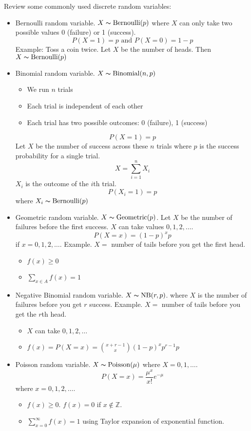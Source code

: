 Review some commonly used discrete random variables:
\begin{itemize}
    \item Bernoulli random variable. $ X \thicksim \text{Bernoulli}(p) $
          where $ X $ can only take two possible values 0 (failure) or 1 (success).
          \[ P(X=1)=p\text{ and }P(X=0)=1-p \]
          Example: Toss a coin twice. Let $ X $ be the number of heads.
          Then $ X \thicksim \text{Bernoulli}(p) $
    \item Binomial random variable. $ X \thicksim \operatorname{Binomial}(n,p) $
          \begin{itemize}
              \item We run $ n $ trials
              \item Each trial is independent of each other
              \item Each trial has two possible outcomes: 0 (failure), 1 (success)
          \end{itemize}
          \[ P(X=1)=p \]
          Let $ X $ be the number of success across these $ n $ trials
          where $ p $ is the success probability for a single trial.
          \[ X=\sum\limits_{i=1}^{n} X_i \]
          $ X_i $ is the outcome of the $ i $th trial.
          \[ P(X_i=1)=p \]
          where $ X_i \thicksim \text{Bernoulli}(p) $
    \item Geometric random variable. $ X \thicksim \operatorname{Geometric}(p) $.
          Let $ X $ be the number of failures before the first success.
          $ X $ can take values $ 0,1,2,\ldots $.
          \[ P(X=x)=(1-p)^x p \]
          if $ x=0,1,2,\ldots $.
          Example. $ X = $ number of tails before you get the first
          head.
          \begin{itemize}
              \item $ f(x)\geqslant 0 $
              \item $ \sum\limits_{x\in A}f(x)=1 $
          \end{itemize}
    \item Negative Binomial random variable. $ X \thicksim \operatorname{NB}(r,p) $.
          where $ X $ is the number of failures before you get $ r $ success.
          Example. $ X= $ number of tails before you get the $ r $th head.
          \begin{itemize}
              \item $ X $ can take $ 0,1,2,\ldots $
              \item $ f(x)=P(X=x)=\binom{x+r-1}{x}(1-p)^x p^{r-1}p $
          \end{itemize}
    \item Poisson random variable. $ X \thicksim \operatorname{Poisson}(\mu) $
          where $ X = 0,1,\ldots $.
          \[ P(X=x)=\frac{\mu^x}{x!} e^{-\mu} \]
          where $ x=0,1,2,\ldots $.
          \begin{itemize}
              \item $ f(x)\geqslant 0 $. $ f(x)=0 $ if $ x\notin\mathbb{Z} $.
              \item $ \sum\limits_{x=0}^{\infty} f(x) =1 $
                    using Taylor expansion of exponential function.
          \end{itemize}
\end{itemize}

